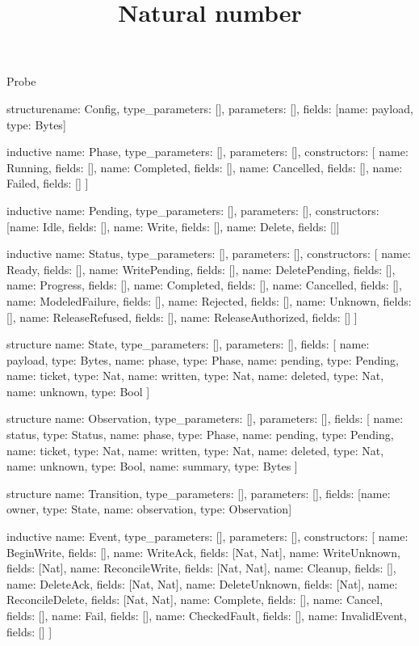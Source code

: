 \begin{lexlean}{Probe}
\title{Natural number}
\begin{semanticmodule}
structure{name: Config, type_parameters: [], parameters: [], fields: [{name: payload, type: Bytes}]}

inductive{
  name: Phase,
  type_parameters: [],
  parameters: [],
  constructors: [
    {name: Running, fields: []},
    {name: Completed, fields: []},
    {name: Cancelled, fields: []},
    {name: Failed, fields: []}
  ]
}

inductive{
  name: Pending,
  type_parameters: [],
  parameters: [],
  constructors: [{name: Idle, fields: []}, {name: Write, fields: []}, {name: Delete, fields: []}]
}

inductive{
  name: Status,
  type_parameters: [],
  parameters: [],
  constructors: [
    {name: Ready, fields: []},
    {name: WritePending, fields: []},
    {name: DeletePending, fields: []},
    {name: Progress, fields: []},
    {name: Completed, fields: []},
    {name: Cancelled, fields: []},
    {name: ModeledFailure, fields: []},
    {name: Rejected, fields: []},
    {name: Unknown, fields: []},
    {name: ReleaseRefused, fields: []},
    {name: ReleaseAuthorized, fields: []}
  ]
}

structure{
  name: State,
  type_parameters: [],
  parameters: [],
  fields: [
    {name: payload, type: Bytes},
    {name: phase, type: Phase},
    {name: pending, type: Pending},
    {name: ticket, type: Nat},
    {name: written, type: Nat},
    {name: deleted, type: Nat},
    {name: unknown, type: Bool}
  ]
}

structure{
  name: Observation,
  type_parameters: [],
  parameters: [],
  fields: [
    {name: status, type: Status},
    {name: phase, type: Phase},
    {name: pending, type: Pending},
    {name: ticket, type: Nat},
    {name: written, type: Nat},
    {name: deleted, type: Nat},
    {name: unknown, type: Bool},
    {name: summary, type: Bytes}
  ]
}

structure{
  name: Transition,
  type_parameters: [],
  parameters: [],
  fields: [{name: owner, type: State}, {name: observation, type: Observation}]
}

inductive{
  name: Event,
  type_parameters: [],
  parameters: [],
  constructors: [
    {name: BeginWrite, fields: []},
    {name: WriteAck, fields: [Nat, Nat]},
    {name: WriteUnknown, fields: [Nat]},
    {name: ReconcileWrite, fields: [Nat, Nat]},
    {name: Cleanup, fields: []},
    {name: DeleteAck, fields: [Nat, Nat]},
    {name: DeleteUnknown, fields: [Nat]},
    {name: ReconcileDelete, fields: [Nat, Nat]},
    {name: Complete, fields: []},
    {name: Cancel, fields: []},
    {name: Fail, fields: []},
    {name: CheckedFault, fields: []},
    {name: InvalidEvent, fields: []}
  ]
}


\end{semanticmodule}
\end{lexlean}
